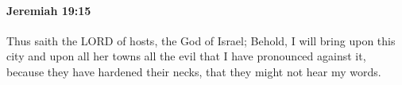 
		\paragraph{Jeremiah 19:15} %
			\label{JEREMIAH-19-15}

			Thus saith the LORD of hosts, the God of Israel; Behold, I will bring upon this city and upon all her towns all the evil that I have pronounced against it, because they have hardened their necks, that they might not hear my words.

